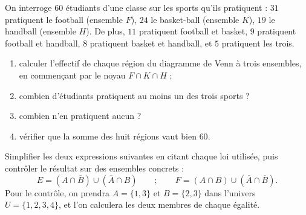 \begin{exercice}
On interroge $60$ étudiants d'une classe sur les sports qu'ils pratiquent : $31$ pratiquent le football (ensemble $F$), $24$ le basket-ball (ensemble $K$), $19$ le handball (ensemble $H$). De plus, $11$ pratiquent football et basket, $9$ pratiquent football et handball, $8$ pratiquent basket et handball, et $5$ pratiquent les trois.
\begin{enumerate}
\item calculer l'effectif de chaque région du diagramme de Venn à trois ensembles, en commençant par le noyau $F \cap K \cap H$ ;
\item combien d'étudiants pratiquent au moins un des trois sports ?
\item combien n'en pratiquent aucun ?
\item vérifier que la somme des huit régions vaut bien $60$.
\end{enumerate}
\end{exercice}

\begin{exercice}
Simplifier les deux expressions suivantes en citant chaque loi utilisée, puis contrôler le résultat sur des ensembles concrets :
\[
E = (A \cap \overline{B}) \cup (\overline{A} \cap B)
\qquad ; \qquad
F = (A \cap B) \cup (\overline{A} \cap \overline{B}) .
\]
Pour le contrôle, on prendra $A = \{1, 3\}$ et $B = \{2, 3\}$ dans l'univers $U = \{1, 2, 3, 4\}$, et l'on calculera les deux membres de chaque égalité.
\end{exercice}
